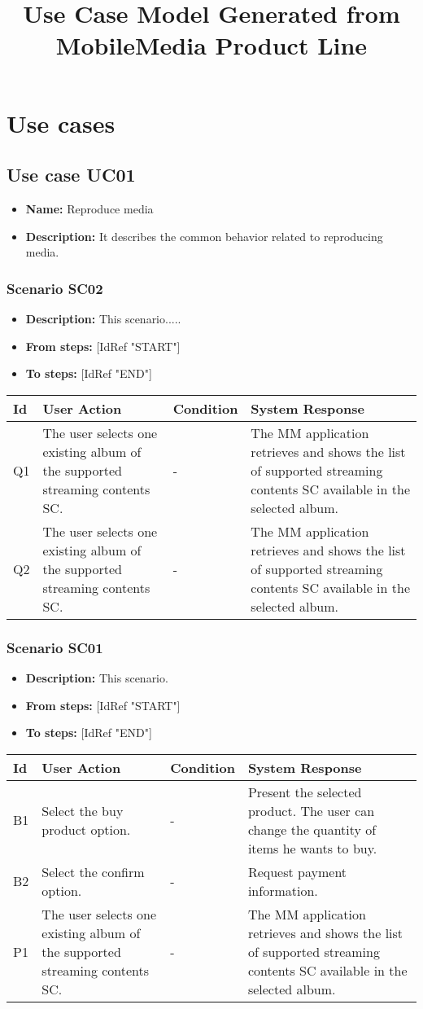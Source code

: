 \documentclass[a4paper,11pt]{article}
\title{Use Case Model Generated from MobileMedia Product Line}
\newcommand{\bl}{\\ \hline}
\begin{document}
\maketitle
\section{Use cases}
\subsection{Use case UC01}
\begin{itemize}
\item {\bf Name: }Reproduce media
\item {\bf Description: }It describes the common behavior related to reproducing media.
\end{itemize}
\subsubsection{Scenario SC02}
\begin{itemize}
\item {\bf Description:} This scenario.....
\item {\bf From steps:} [IdRef "START"]
\item {\bf To steps:} [IdRef "END"]
\end{itemize}
\begin{tabular}{|p{0.4in}|p{1.5in}|p{1.5in}|p{1.5in}|}
\hline
Id & User Action & Condition & System Response \bl 
Q1 & 
                	The user selects one existing album of the supported streaming
					contents {SC}.
				 & - & 
                	The MM application retrieves and
					shows the list of supported streaming contents {SC}
					available in the selected album.
				\bl
Q2 & 
                	The user selects one existing album of the supported streaming
					contents {SC}.
				 & - & 
                	The MM application retrieves and
					shows the list of supported streaming contents {SC}
					available in the selected album.
				\bl
\end{tabular}
\subsubsection{Scenario SC01}
\begin{itemize}
\item {\bf Description:} This scenario.
\item {\bf From steps:} [IdRef "START"]
\item {\bf To steps:} [IdRef "END"]
\end{itemize}
\begin{tabular}{|p{0.4in}|p{1.5in}|p{1.5in}|p{1.5in}|}
\hline
Id & User Action & Condition & System Response \bl 
B1 & Select the buy product option.  & - & Present the selected product. The user can change the quantity of items he
                    wants to buy. \bl
B2 & Select the confirm option.  & - & Request payment information. \bl
P1 & 
                	The user selects one existing album of the supported streaming
					contents {SC}.
				 & - & 
                	The MM application retrieves and
					shows the list of supported streaming contents {SC}
					available in the selected album.
				\bl
\end{tabular}
\end{document}
